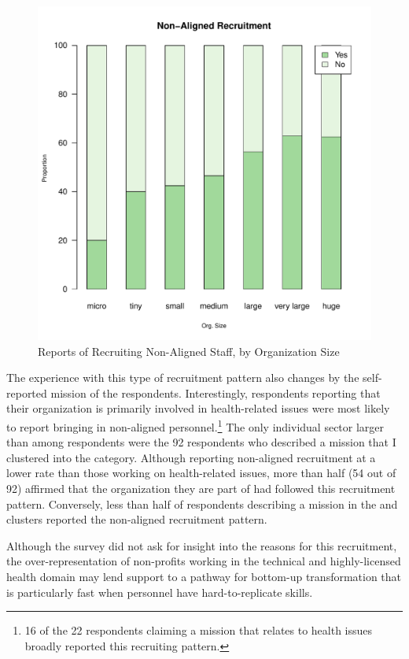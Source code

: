 \begin{figure}[t]
\includegraphics[width=.85\columnwidth]{./Pictures/NonAlignedRecruitmentBySize.pdf}
\centering
\caption{Reports of Recruiting Non-Aligned Staff, by Organization Size}
\label{fig:nonalignedsize}
\end{figure}

The experience with this type of recruitment pattern also changes by the self-reported mission of the respondents. Interestingly, respondents reporting that their organization is primarily involved in health-related issues were most likely to report bringing in non-aligned personnel.\footnote{16 of the 22 respondents claiming a mission that relates to health issues broadly reported this recruiting pattern.} The only individual sector larger than  among respondents were the 92 respondents who described a mission that I clustered into the  category. Although reporting non-aligned recruitment at a lower rate than those working on health-related issues, more than half (54 out of 92) affirmed that the organization they are part of had followed this recruitment pattern. Conversely, less than half of respondents describing a mission in the   and  clusters reported the non-aligned recruitment pattern. 

Although the survey did not ask for insight into the reasons for this recruitment, the over-representation of non-profits working in the technical and highly-licensed health domain may lend support to a pathway for bottom-up transformation that is particularly fast when personnel have hard-to-replicate skills.

